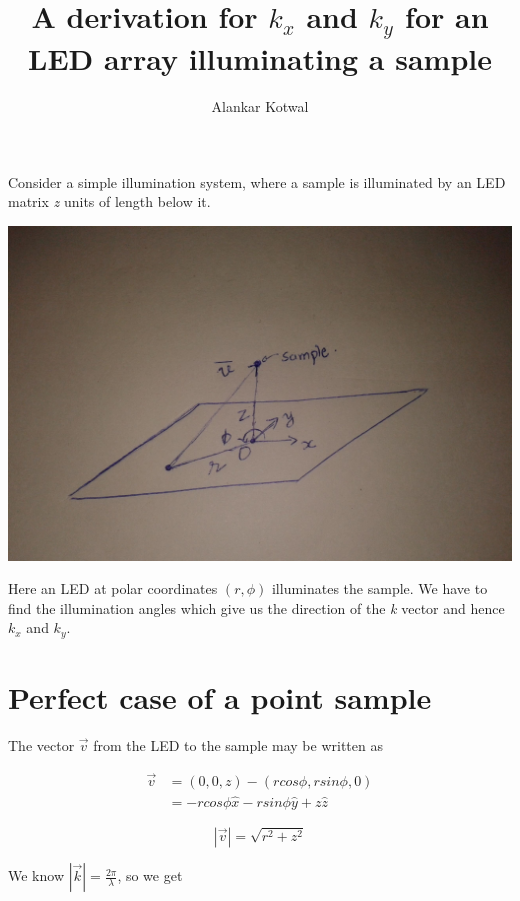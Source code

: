 \documentclass[11pt]{article}
\title{A derivation for $k_x$ and $k_y$ for an LED array illuminating a sample}
\author{Alankar Kotwal}
\begin{document}
\maketitle

Consider a simple illumination system, where a sample is illuminated by an LED matrix \textit{z} units of length below it. \\

\centerline{\includegraphics[scale=0.15]{figure.jpg}}

Here an LED at polar coordinates $(r, \phi )$ illuminates the sample. We have to find the illumination angles which give us the direction of the \textit{k} vector and hence $k_x$ and $k_y$. \\

\section{Perfect case of a point sample}

The vector $\vec{v}$ from the LED to the sample may be written as

\begin{equation*} \label{eq1}
\begin{split}
\vec{v} & = (0, 0, z) - (r cos \phi , r sin \phi , 0) \\
 & = -r cos \phi \hat{x} - r sin \phi \hat{y} + z \hat{z}
\end{split}
\end{equation*}

\begin{equation*}
|\vec{v}| = \sqrt{r^2 + z^2}
\end{equation*}

We know $|\vec{k}| = \frac{2 \pi}{\lambda}$, so we get
\end{document}
